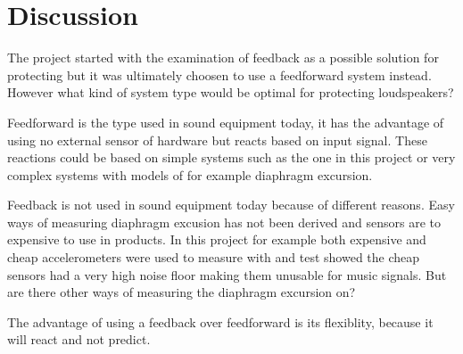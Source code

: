 \chapter{Discussion}
The project started with the examination of feedback as a possible solution for protecting but it was ultimately choosen to use a feedforward system instead. However what kind of system type would be optimal for protecting loudspeakers?

Feedforward is the type used in sound equipment today, it has the advantage of using no external sensor of hardware but reacts based on input signal. These reactions could be based on simple systems such as the one in this project or very complex systems with models of for example diaphragm excursion. 

Feedback is not used in sound equipment today because of different reasons. Easy ways of measuring diaphragm excusion has not been derived and sensors are to expensive to use in products. In this project for example both expensive and cheap accelerometers were used to measure with and test showed the cheap sensors had a very high noise floor making them unusable for music signals. But are there other ways of measuring the diaphragm excursion on?



The advantage of using a feedback over feedforward is its flexiblity, because it will react and not predict.     